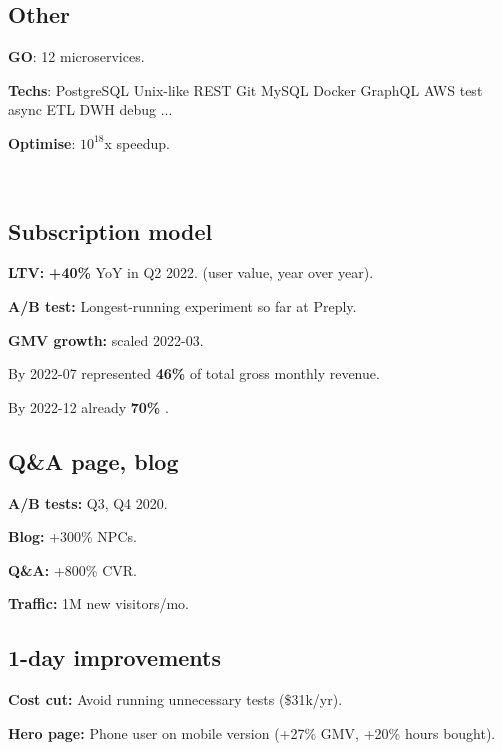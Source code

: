 \documentclass[a4paper]{MagicalCV}
\begin{document}
\begin{minipage}[t]{0.33\textwidth}
\subsection{Other}
\begin{tightemize}
\item {\bf GO}: 12 microservices.
\item {\bf Techs}: PostgreSQL \textbullet{} Unix-like \textbullet{} REST \textbullet{} Git \textbullet{} MySQL \textbullet{} Docker \textbullet{}
 GraphQL \textbullet{} AWS \textbullet{} test \textbullet{} async \textbullet{} ETL \textbullet{} DWH \textbullet{} debug \textbullet{} ...
\item {\bf Optimise}: $10^{18}$x speedup.
\end{tightemize}

 \\
\subsection{Subscription model}
\begin{tightemize}
\item {\bf LTV: } {\bf +40\% } YoY in Q2 2022. (user value, year over year).
\item {\bf A/B test: } Longest-running experiment so far at Preply.
\item {\bf GMV growth: } scaled 2022-03.
  \item By 2022-07 represented {\bf 46\%} of total gross monthly revenue.
  \item By 2022-12 already {\bf 70\% }.

\end{tightemize}
\sectionsep

\subsection{Q\&A page, blog}
\begin{tightemize}
\item {\bf A/B tests: } Q3, Q4 2020.
\item {\bf Blog: } +300\% NPCs.
\item {\bf Q\&A: } +800\% CVR.
\item {\bf Traffic: } 1M new visitors/mo.
\end{tightemize}
\sectionsep


\subsection{1-day improvements}
\begin{tightemize}
\item {\bf Cost cut: } Avoid running unnecessary tests (\$31k/yr).
\item {\bf Hero page: } Phone user on mobile version (+27\% GMV, +20\% hours bought).

\end{tightemize}
\sectionsep


\end{minipage}
\end{document}
